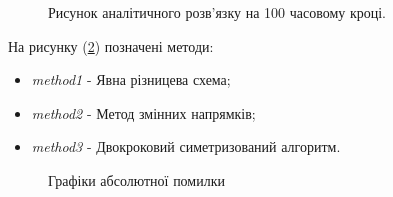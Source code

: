 \documentclass[a4paper,12pt]{article}
\begin{document}
\begin{figure}[h]
	\caption{Рисунок аналітичного розв'язку на 100 часовому кроці.}
	\label{ris1}
\end{figure}

На рисунку (\ref{ris2}) позначені методи:
\begin{itemize}
	\item \textit{method1} - Явна різницева схема;
	\item \textit{method2} - Метод змінних напрямків;
	\item \textit{method3} - Двокроковий симетризований алгоритм.
\end{itemize}

\newpage
\begin{figure}[ht]
	\caption{Графіки абсолютної помилки}
	\label{ris2}
\end{figure}
\end{document}
